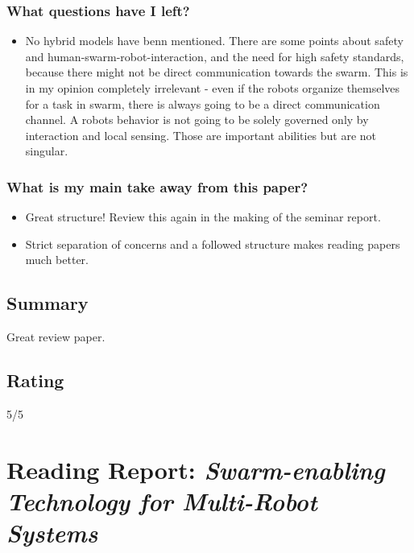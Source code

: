     \subsubsection*{What questions have I left?}
    \begin{itemize}
        \item No hybrid models have benn mentioned. There are some points about safety and human-swarm-robot-interaction, and the need for high safety standards, because there might not be direct communication towards the swarm. This is in my opinion completely irrelevant - even if the robots organize themselves for a task in swarm, there is always going to be a direct communication channel. A robots behavior is not going to be solely governed only by interaction and local sensing. Those are important abilities but are not singular.    
    \end{itemize}
    \subsubsection*{What is my main take away from this paper?}
    \begin{itemize}
        \item Great structure! Review this again in the making of the seminar report. 
        \item Strict separation of concerns and a followed structure makes reading papers much better.
    \end{itemize}
    
    \subsection*{Summary}
    Great review paper.
    
    \subsection*{Rating}
    5/5
    \newpage
    
    \section{Reading Report: \emph{Swarm-enabling Technology for Multi-Robot Systems}}
    \cite{Chamanbaz2017}
    
